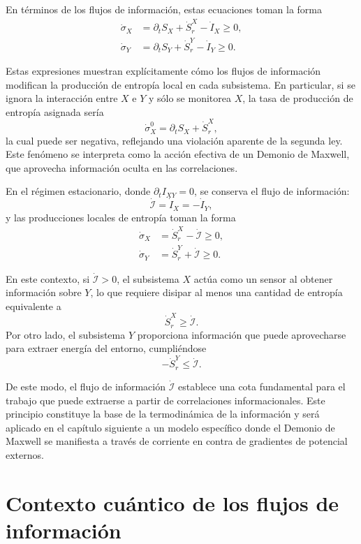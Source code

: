 En términos de los flujos de información, estas ecuaciones toman la forma
\begin{align*}
    \dot{\sigma}_{X} & = \partial_{t}S_{X} + \dot{S}_{r}^{X} - \dot{I}_{X} \geq 0, \\
    \dot{\sigma}_{Y} & = \partial_{t}S_{Y} + \dot{S}_{r}^{Y} - \dot{I}_{Y} \geq 0.
\end{align*}

Estas expresiones muestran explícitamente cómo los flujos de información modifican la producción de entropía local en cada subsistema. En particular, si se ignora la interacción entre \( X \) e \( Y \) y sólo se monitorea \( X \), la tasa de producción de entropía asignada sería
\[
\dot{\sigma}_{X}^0 = \partial_{t} S_{X} + \dot{S}_{r}^{X},
\]
la cual puede ser negativa, reflejando una violación aparente de la segunda ley. Este fenómeno se interpreta como la acción efectiva de un Demonio de Maxwell, que aprovecha información oculta en las correlaciones.

En el régimen estacionario, donde \( \partial_t I_{XY} = 0 \), se conserva el flujo de información:
\[
\dot{\mathcal{I}} = \dot{I}_{X} = -\dot{I}_{Y},
\]
y las producciones locales de entropía toman la forma
\begin{align*}
    \dot{\sigma}_{X} & = \dot{S}_{r}^{X} - \dot{\mathcal{I}} \geq 0, \\
    \dot{\sigma}_{Y} & = \dot{S}_{r}^{Y} + \dot{\mathcal{I}} \geq 0.
\end{align*}

En este contexto, si \( \dot{\mathcal{I}} > 0 \), el subsistema \( X \) actúa como un sensor al obtener información sobre \( Y \), lo que requiere disipar al menos una cantidad de entropía equivalente a
\[
\dot{S}_{r}^{X} \geq \dot{\mathcal{I}}.
\]
Por otro lado, el subsistema \( Y \) proporciona información que puede aprovecharse para extraer energía del entorno, cumpliéndose
\[
-\dot{S}_{r}^{Y} \leq \dot{\mathcal{I}}.
\]

De este modo, el flujo de información \( \dot{\mathcal{I}} \) establece una cota fundamental para el trabajo que puede extraerse a partir de correlaciones informacionales. Este principio constituye la base de la termodinámica de la información y será aplicado en el capítulo siguiente a un modelo específico donde el Demonio de Maxwell se manifiesta a través de corriente en contra de gradientes de potencial externos.

\section{Contexto cuántico de los flujos de información}

